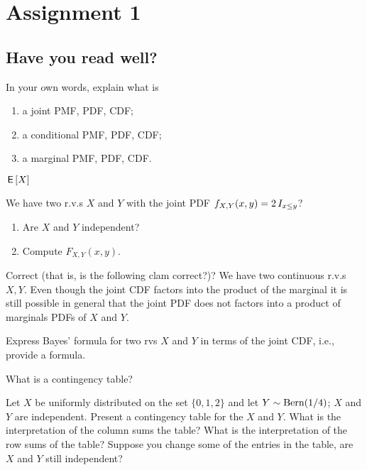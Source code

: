 \documentclass[assignments]{subfiles}
\begin{document}
\section{Assignment 1}
\label{sec:org9cbca82}


\subsection{Have you read well?}
\label{sec:have-you-read}


\begin{exercise}
In your own words, explain what is
\begin{enumerate}
\item a joint PMF, PDF, CDF;
\item a conditional PMF, PDF, CDF;
\item a marginal PMF, PDF, CDF.
\end{enumerate}
\end{exercise}

$\,\mathsf{E}\left[X\right]$

\begin{exercise}
We have two r.v.s $X$ and $Y$ with the joint PDF $f_{X,Y}(x,y) = 2 \,I_{x\leq y}$? 
\begin{enumerate}
\item Are $X$ and $Y$ independent? 
\item Compute $F_{X,Y}(x,y)$. 
\end{enumerate}
\end{exercise}

\begin{exercise}
Correct (that is, is the following clam correct?)? We have two continuous r.v.s $X, Y$. Even though the joint CDF factors into the product of the marginal it is still possible in general that the joint PDF does not factors into a product of marginals PDFs of $X$ and $Y$.
\end{exercise}

\begin{exercise}
Express Bayes' formula for two rvs $X$ and $Y$ in terms of the joint CDF, i.e., provide a formula.
\end{exercise}

\begin{exercise}
What is a contingency table?
\end{exercise}

\begin{exercise}
Let $X$ be uniformly distributed on the set $\{0,1,2\}$ and let $Y \sim \mathrm{Bern}(1/4)$; $X$ and $Y$ are independent.
Present a contingency table for the $X$ and $Y$.
What is the interpretation of the column sums the table?
What is the interpretation of the row sums of the table? Suppose you change some of the entries in the table, are $X$ and $Y$ still independent?
\end{exercise}
\end{document}
